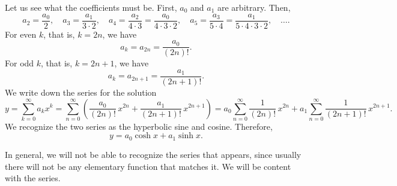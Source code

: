 \begin{example}
Let us see what the coefficients
must be.  First, $a_0$ and $a_1$ are arbitrary.  Then,
\begin{equation*}
a_2 = \frac{a_0}{2}, \quad
a_3 = \frac{a_1}{3 \cdot 2}, \quad
a_4 = \frac{a_2}{4 \cdot 3} = \frac{a_0}{4 \cdot 3 \cdot 2}, \quad
a_5 = \frac{a_3}{5 \cdot 4} = \frac{a_1}{5 \cdot 4 \cdot 3 \cdot 2}, \quad
\ldots .
\end{equation*}
For even $k$, that is, $k=2n$,
we have
\begin{equation*}
a_k = a_{2n} = \frac{a_0}{(2n)!} .
\end{equation*}
For odd $k$, that is, $k=2n+1$, we have
\begin{equation*}
a_k = a_{2n+1} = \frac{a_1}{(2n+1)!} .
\end{equation*}
We write down the series for the solution
\begin{equation*}
y
=
\sum_{k=0}^\infty
a_k x^k
=
\sum_{n=0}^\infty
\left(
\frac{a_0}{(2n)!} \,x^{2n}
+
\frac{a_1}{(2n+1)!} \,x^{2n+1}
\right)
=
a_0
\sum_{n=0}^\infty
\frac{1}{(2n)!} \,x^{2n}
+
a_1
\sum_{n=0}^\infty
\frac{1}{(2n+1)!} \,x^{2n+1} .
\end{equation*}
We recognize the two series as the hyperbolic sine and cosine.
Therefore,
\begin{equation*}
y =
a_0 \cosh x + a_1 \sinh x .
\end{equation*}
\end{example}

In general, we will not be able to recognize 
the series that appears, since usually there will not be
any elementary function that matches it.  We will be
content with the series.

